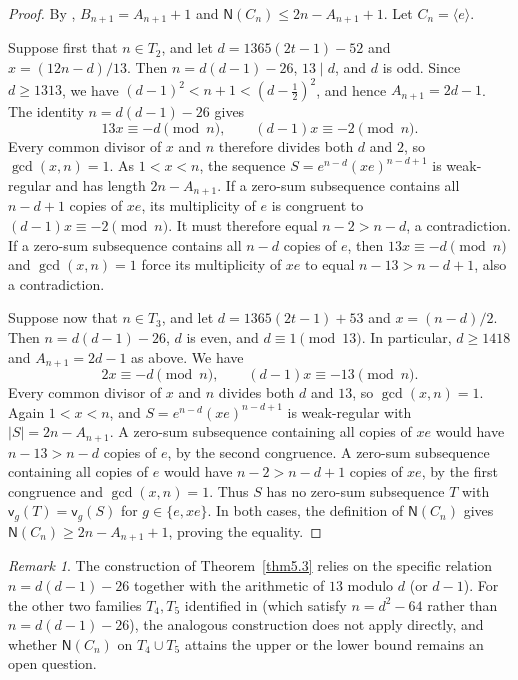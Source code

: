 \documentclass[10pt,a4paper]{amsart}
\theoremstyle{definition}
\theoremstyle{remark}
\newtheorem{rem}[thm]{Remark}
\numberwithin{equation}{section}
\begin{document}
\begin{proof}
By \cite[Lemmas~5.2 and~4.3]{[JY2024]},
$B_{n+1}=A_{n+1}+1$ and $\mathsf N(C_n)\le2n-A_{n+1}+1$.
Let $C_n=\langle e\rangle$.

Suppose first that $n\in T_2$, and let
$d=1365(2t-1)-52$ and $x=(12n-d)/13$.
Then $n=d(d-1)-26$, $13\mid d$, and $d$ is odd.
Since $d\ge1313$, we have
$(d-1)^2<n+1<(d-\tfrac12)^2$, and hence $A_{n+1}=2d-1$.
The identity $n=d(d-1)-26$ gives
\[
13x\equiv-d\pmod n,\qquad (d-1)x\equiv-2\pmod n.
\]
Every common divisor of $x$ and $n$ therefore divides both $d$ and $2$,
so $\gcd(x,n)=1$.
As $1<x<n$, the sequence $S=e^{n-d}(xe)^{n-d+1}$ is weak-regular
and has length $2n-A_{n+1}$.
If a zero-sum subsequence contains all $n-d+1$ copies of $xe$,
its multiplicity of $e$ is congruent to $(d-1)x\equiv-2\pmod n$.
It must therefore equal $n-2>n-d$, a contradiction.
If a zero-sum subsequence contains all $n-d$ copies of $e$,
then $13x\equiv-d\pmod n$ and $\gcd(x,n)=1$ force its
multiplicity of $xe$ to equal $n-13>n-d+1$, also a contradiction.

Suppose now that $n\in T_3$, and let
$d=1365(2t-1)+53$ and $x=(n-d)/2$.
Then $n=d(d-1)-26$, $d$ is even, and $d\equiv1\pmod{13}$.
In particular, $d\ge1418$ and $A_{n+1}=2d-1$ as above. We have
\[
2x\equiv-d\pmod n,\qquad (d-1)x\equiv-13\pmod n.
\]
Every common divisor of $x$ and $n$ divides both $d$ and $13$,
so $\gcd(x,n)=1$.
Again $1<x<n$, and $S=e^{n-d}(xe)^{n-d+1}$ is weak-regular
with $|S|=2n-A_{n+1}$.
A zero-sum subsequence containing all copies of $xe$ would have
$n-13>n-d$ copies of $e$, by the second congruence.
A zero-sum subsequence containing all copies of $e$ would have
$n-2>n-d+1$ copies of $xe$, by the first congruence and $\gcd(x,n)=1$.
Thus $S$ has no zero-sum subsequence $T$ with
$\mathsf v_g(T)=\mathsf v_g(S)$ for $g\in\{e,xe\}$.
In both cases, the definition of $\mathsf N(C_n)$ gives
$\mathsf N(C_n)\ge2n-A_{n+1}+1$, proving the equality.
\end{proof}

\begin{rem}
	The construction of Theorem~\ref{thm5.3} relies on the specific relation
	$n=d(d-1)-26$ together with the arithmetic of $13$ modulo $d$ (or $d-1$).
	For the other two families $T_4,T_5$ identified in \cite[Lemma~5.2]{[JY2024]}
	(which satisfy $n=d^2-64$ rather than $n=d(d-1)-26$), the analogous construction
	does not apply directly, and whether $\mathsf{N}(C_n)$ on $T_4\cup T_5$ attains
	the upper or the lower bound remains an open question.
\end{rem}
\end{document}

